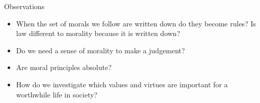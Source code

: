 \documentclass[11pt, oneside]{article}   	%
\begin{document}
\par Observations
\begin{itemize}
	\item When the set of morals we follow are written down do they become rules? Is law different to morality because it is written down?
	\item Do we need a sense of morality to make a judgement?
	\item Are moral principles absolute?
	\item How do we investigate which values and virtues are important for a worthwhile life in society?
\end{itemize}
\end{document}
